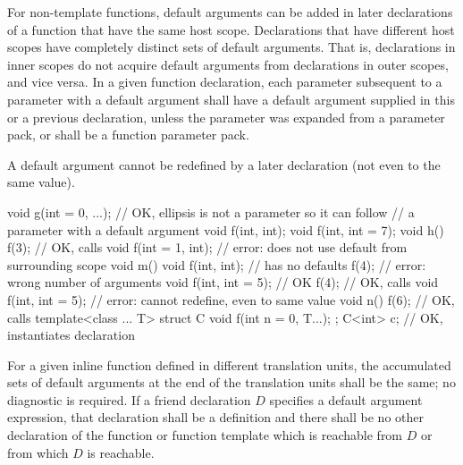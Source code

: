 \pnum
For non-template functions, default arguments can be added in later
declarations of a
function that have the same host scope.
Declarations that have different
host scopes have completely distinct sets of default arguments.
That
is, declarations in inner scopes do not acquire default
arguments from declarations in outer scopes, and vice versa.
In
a given function declaration, each parameter subsequent to a
parameter with a default argument shall have a default argument
supplied in this or a previous declaration,
unless the parameter was expanded from a parameter pack,
or shall be a function parameter pack.
\begin{note}
A default argument
cannot be redefined by a later declaration
(not even to the same value).
\end{note}
\begin{example}
\begin{codeblock}
void g(int = 0, ...);           // OK, ellipsis is not a parameter so it can follow
                                // a parameter with a default argument
void f(int, int);
void f(int, int = 7);
void h() {
  f(3);                         // OK, calls 
  void f(int = 1, int);         // error: does not use default from surrounding scope
}
void m() {
  void f(int, int);             // has no defaults
  f(4);                         // error: wrong number of arguments
  void f(int, int = 5);         // OK
  f(4);                         // OK, calls 
  void f(int, int = 5);         // error: cannot redefine, even to same value
}
void n() {
  f(6);                         // OK, calls 
}
template<class ... T> struct C {
  void f(int n = 0, T...);
};
C<int> c;                       // OK, instantiates declaration 
\end{codeblock}
\end{example}
For a given inline function defined in different translation units,
the accumulated sets of default arguments at the end of the
translation units shall be the same;
no diagnostic is required.
If a friend declaration $D$ specifies a default argument expression,
that declaration shall be a definition and there shall be no other
declaration of the function or function template
which is reachable from $D$ or from which $D$ is reachable.

